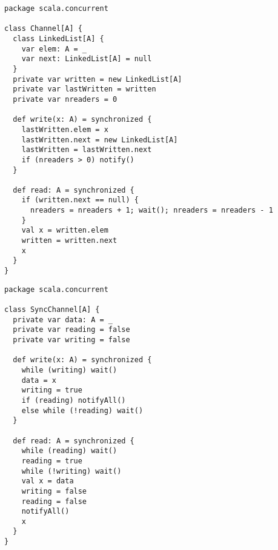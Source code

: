 \begin{lstlisting}
package scala.concurrent

class Channel[A] {
  class LinkedList[A] {
    var elem: A = _
    var next: LinkedList[A] = null
  }
  private var written = new LinkedList[A]
  private var lastWritten = written
  private var nreaders = 0

  def write(x: A) = synchronized {
    lastWritten.elem = x
    lastWritten.next = new LinkedList[A]
    lastWritten = lastWritten.next
    if (nreaders > 0) notify()
  }

  def read: A = synchronized {
    if (written.next == null) {
      nreaders = nreaders + 1; wait(); nreaders = nreaders - 1
    }
    val x = written.elem
    written = written.next
    x
  }
}
\end{lstlisting}


\begin{lstlisting}
package scala.concurrent

class SyncChannel[A] {
  private var data: A = _
  private var reading = false
  private var writing = false

  def write(x: A) = synchronized {
    while (writing) wait()
    data = x
    writing = true
    if (reading) notifyAll()
    else while (!reading) wait()
  }

  def read: A = synchronized {
    while (reading) wait()
    reading = true
    while (!writing) wait()
    val x = data
    writing = false
    reading = false
    notifyAll()
    x
  }
}
\end{lstlisting}


